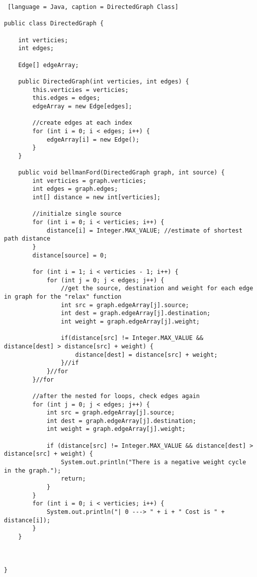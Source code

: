 \documentclass{article}
\begin{document}
\begin{lstlisting} [language = Java, caption = DirectedGraph Class]

public class DirectedGraph {

    int verticies;
    int edges;

    Edge[] edgeArray;

    public DirectedGraph(int verticies, int edges) {
        this.verticies = verticies;
        this.edges = edges;
        edgeArray = new Edge[edges];

        //create edges at each index
        for (int i = 0; i < edges; i++) {
            edgeArray[i] = new Edge();
        }
    }

    public void bellmanFord(DirectedGraph graph, int source) {
        int verticies = graph.verticies;
        int edges = graph.edges;
        int[] distance = new int[verticies];

        //initialze single source
        for (int i = 0; i < verticies; i++) {
            distance[i] = Integer.MAX_VALUE; //estimate of shortest path distance
        }
        distance[source] = 0;

        for (int i = 1; i < verticies - 1; i++) {
            for (int j = 0; j < edges; j++) {
                //get the source, destination and weight for each edge in graph for the "relax" function
                int src = graph.edgeArray[j].source;
                int dest = graph.edgeArray[j].destination;
                int weight = graph.edgeArray[j].weight;
                
                if(distance[src] != Integer.MAX_VALUE && distance[dest] > distance[src] + weight) {
                    distance[dest] = distance[src] + weight;
                }//if
            }//for
        }//for

        //after the nested for loops, check edges again
        for (int j = 0; j < edges; j++) {
            int src = graph.edgeArray[j].source;
            int dest = graph.edgeArray[j].destination;
            int weight = graph.edgeArray[j].weight;

            if (distance[src] != Integer.MAX_VALUE && distance[dest] > distance[src] + weight) {
                System.out.println("There is a negative weight cycle in the graph.");
                return;
            }
        }
        for (int i = 0; i < verticies; i++) {
            System.out.println("| 0 ---> " + i + " Cost is " + distance[i]);
        }
    }

    

}

\end{lstlisting}
\end{document}
